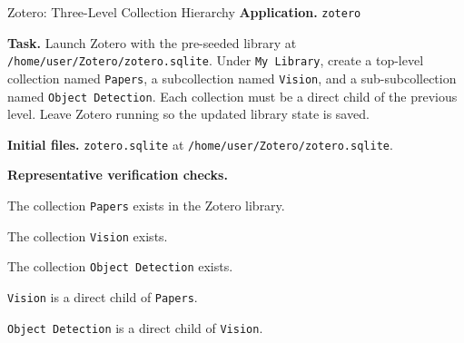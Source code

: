 \documentclass{llmxive}
\providecommand{\taskfield}[1]{\vspace{0.25em}\noindent\textbf{#1.}}
\begin{document}
\begin{taskexample}{Zotero: Three-Level Collection Hierarchy}
\taskfield{Application} \texttt{zotero}

\taskfield{Task} Launch Zotero with the pre-seeded library at
\texttt{/home/user/Zotero/zotero.sqlite}. Under \texttt{My Library}, create a
top-level collection named \texttt{Papers}, a subcollection named
\texttt{Vision}, and a sub-subcollection named \texttt{Object Detection}.
Each collection must be a direct child of the previous level. Leave Zotero
running so the updated library state is saved.

\taskfield{Initial files}
\texttt{zotero.sqlite} at \texttt{/home/user/Zotero/zotero.sqlite}.

\taskfield{Representative verification checks}
\begin{compactitem}
    \item The collection \texttt{Papers} exists in the Zotero library.
    \item The collection \texttt{Vision} exists.
    \item The collection \texttt{Object Detection} exists.
    \item \texttt{Vision} is a direct child of \texttt{Papers}.
    \item \texttt{Object Detection} is a direct child of \texttt{Vision}.
\end{compactitem}
\end{taskexample}
\end{document}
